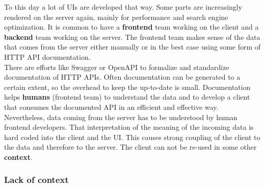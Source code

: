 To this day a lot of UIs are developed that way. Some parts are increasingly rendered on the server again, mainly for performance and search engine optimization. It is common to have a \textbf{frontend} team working on the client and a \textbf{backend} team working on the server. The frontend team makes sense of the data that comes from the server either manually or in the best case using some form of HTTP API documentation.
\\ There are efforts like Swagger or OpenAPI to formalize and standardize documentation of HTTP APIs. Often documentation can be generated to a certain extent, so the overhead to keep the up-to-date is small. Documentation helps \textbf{humans} (frontend team) to understand the data and to develop a client that consumes the documented API in an efficient and effective way.
\\ Nevertheless, data coming from the server has to be understood by human frontend developers. That interpretation of the meaning of the incoming data is hard coded into the client and the UI. This causes strong coupling of the client to the data and therefore to the server. The client can not be re-used in some other \textbf{context}.

\subsubsection{Lack of context}\label{datahumanmachine}

